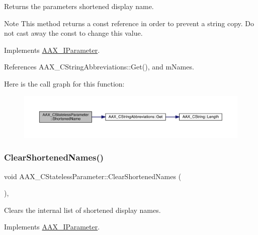 Returns the parameter\textquotesingle{}s shortened display name. 

\begin{DoxyNote}{Note}
This method returns a const reference in order to prevent a string copy. Do not cast away the const to change this value. 
\end{DoxyNote}


Implements \mbox{\hyperlink{a01857_a729ead00bf12103793557f39a01f782c}{A\+A\+X\+\_\+\+I\+Parameter}}.



References A\+A\+X\+\_\+\+C\+String\+Abbreviations\+::\+Get(), and m\+Names.

Here is the call graph for this function\+:
\nopagebreak
\begin{figure}[H]
\begin{center}
\leavevmode
\includegraphics[width=350pt]{a01541_a2cf8f9e426e01d3eabea95447e856c23_cgraph}
\end{center}
\end{figure}
\mbox{\label{a01541_a1a3829b633e0eeb8771d2cacc9b1ac70}} 
\subsubsection{\texorpdfstring{ClearShortenedNames()}{ClearShortenedNames()}}
{\footnotesize\ttfamily void A\+A\+X\+\_\+\+C\+Stateless\+Parameter\+::\+Clear\+Shortened\+Names (\begin{DoxyParamCaption}{ }\end{DoxyParamCaption})\hspace{0.3cm}{\ttfamily [inline]}, {\ttfamily [virtual]}}



Clears the internal list of shortened display names. 



Implements \mbox{\hyperlink{a01857_ae8601be6754169f626269f81f38b4581}{A\+A\+X\+\_\+\+I\+Parameter}}.



